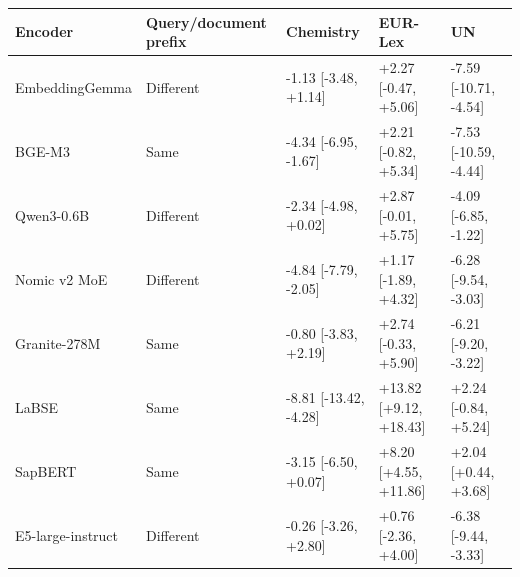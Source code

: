 \begin{tabular}{lllll}
\toprule
Encoder & Query/document prefix & Chemistry & EUR-Lex & UN \\
\midrule
EmbeddingGemma & Different & -1.13 [-3.48, +1.14] & +2.27 [-0.47, +5.06] & -7.59 [-10.71, -4.54] \\
BGE-M3 & Same & -4.34 [-6.95, -1.67] & +2.21 [-0.82, +5.34] & -7.53 [-10.59, -4.44] \\
Qwen3-0.6B & Different & -2.34 [-4.98, +0.02] & +2.87 [-0.01, +5.75] & -4.09 [-6.85, -1.22] \\
Nomic v2 MoE & Different & -4.84 [-7.79, -2.05] & +1.17 [-1.89, +4.32] & -6.28 [-9.54, -3.03] \\
Granite-278M & Same & -0.80 [-3.83, +2.19] & +2.74 [-0.33, +5.90] & -6.21 [-9.20, -3.22] \\
LaBSE & Same & -8.81 [-13.42, -4.28] & +13.82 [+9.12, +18.43] & +2.24 [-0.84, +5.24] \\
SapBERT & Same & -3.15 [-6.50, +0.07] & +8.20 [+4.55, +11.86] & +2.04 [+0.44, +3.68] \\
E5-large-instruct & Different & -0.26 [-3.26, +2.80] & +0.76 [-2.36, +4.00] & -6.38 [-9.44, -3.33] \\
\bottomrule
\end{tabular}
